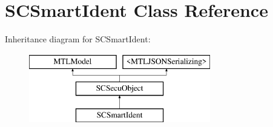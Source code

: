 \hypertarget{interface_s_c_smart_ident}{}\section{S\+C\+Smart\+Ident Class Reference}
\label{interface_s_c_smart_ident}
Inheritance diagram for S\+C\+Smart\+Ident\+:\begin{figure}[H]
\begin{center}
\leavevmode
\includegraphics[height=3.000000cm]{interface_s_c_smart_ident}
\end{center}
\end{figure}
